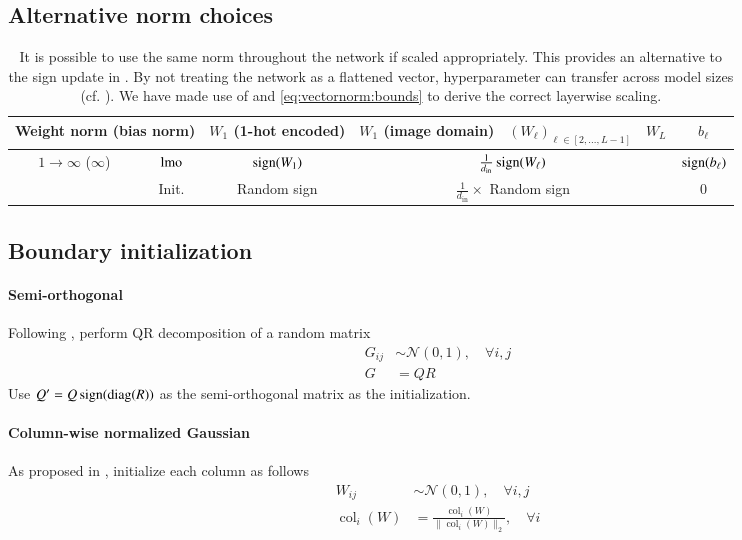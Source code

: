 \subsection{Alternative norm choices} 

\begin{table*}[h]
\centering
\caption{
  It is possible to use the same norm throughout the network if scaled appropriately.
  This provides an alternative to the sign update in .
  By not treating the network as a flattened vector, hyperparameter can transfer across model sizes (cf. ).
  We have made use of  and \eqref{eq:vectornorm:bounds} to derive the correct layerwise scaling.
}
\label{tbl:parameter:lmo:same-norm}
\bgroup
\def\arraystretch{1.2}
\begin{tabular}{|c|c|c|c|c|c|c|}
\hline
\multicolumn{2}{|c|}{Weight norm (bias norm) }
    & $W_1$ (1-hot encoded) 
    & $W_1$ (image domain) 
    & $(W_\ell)_{\ell \in [2,...,L-1]}$
    & $W_L$
    & $b_\ell$ \\
\hline
\hline
\multirow{ 2}{*}{$1 \rightarrow \infty$ ($\infty$)}
  & $\operatorname{lmo}$
  & $\operatorname{sign}(W_1)$
  & \multicolumn{3}{c|}{$\tfrac{1}{d_\mathrm{in}}\operatorname{sign}(W_\ell)$}
  & $\operatorname{sign}(b_\ell)$
\\
  & Init.
  & Random sign
  & \multicolumn{3}{c|}{$\tfrac{1}{d_\mathrm{in}}\times$ Random sign}
  & $0$ \\
\hline
\end{tabular}
\egroup
\end{table*}

\subsection{Boundary initialization} 

\paragraph{Semi-orthogonal}
Following \citet{saxe2013exact}, perform QR decomposition of a random matrix
\begin{equation*}
\begin{split}
G_{ij} &\sim \mathcal{N}(0, 1), \quad \forall i, j \\
G &= QR
\end{split}
\end{equation*}
Use \(Q'=Q\operatorname{sign}(\operatorname{diag}(R))\) as the semi-orthogonal matrix as the initialization.

\paragraph{Column-wise normalized Gaussian}
As proposed in \citet{large2024scalable}, initialize each column as follows
\begin{equation*}
\begin{split}
W_{ij} &\sim \mathcal{N}(0, 1), \quad \forall i, j \\
\operatorname{col}_i(W) &= \frac{\operatorname{col}_i(W)}{\|\operatorname{col}_i(W)\|_2}, \quad \forall i
\end{split}
\end{equation*}

